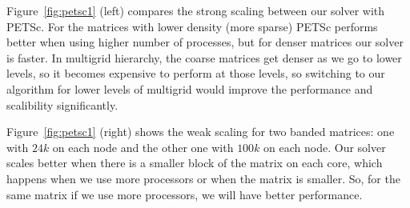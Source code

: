 Figure~\ref{fig:petsc1} (left) compares the strong scaling between our solver with PETSc. For the matrices with lower density (more sparse) PETSc performs better when using higher number of processes, but for denser matrices our solver is faster. In multigrid hierarchy, the coarse matrices get denser as we go to lower levels, so it becomes expensive to perform \mm at those levels, so switching to our algorithm for lower levels of multigrid would improve the performance and scalibility significantly.

Figure~\ref{fig:petsc1} (right) shows the weak scaling for two banded matrices: one with $24k$ on each node and the other one with $100k$ on each node. Our solver scales better when there is a smaller block of the matrix on each core, which happens when we use more processors or when the matrix is smaller. So, for the same matrix if we use more processors, we will have better performance.

